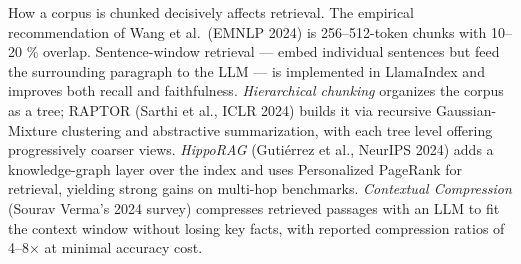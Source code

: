 How a corpus is chunked decisively affects retrieval. The empirical recommendation of Wang et al.~(EMNLP 2024) is 256--512-token chunks with 10--20 \% overlap. Sentence-window retrieval --- embed individual sentences but feed the surrounding paragraph to the LLM --- is implemented in LlamaIndex and improves both recall and faithfulness. \emph{Hierarchical chunking} organizes the corpus as a tree; RAPTOR (Sarthi et al., ICLR 2024) builds it via recursive Gaussian-Mixture clustering and abstractive summarization, with each tree level offering progressively coarser views. \emph{HippoRAG} (Gutiérrez et al., NeurIPS 2024) adds a knowledge-graph layer over the index and uses Personalized PageRank for retrieval, yielding strong gains on multi-hop benchmarks. \emph{Contextual Compression} (Sourav Verma's 2024 survey) compresses retrieved passages with an LLM to fit the context window without losing key facts, with reported compression ratios of 4--8× at minimal accuracy cost.

